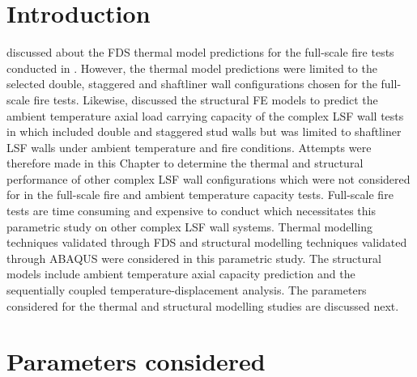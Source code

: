 \section{Introduction}

 discussed about the FDS thermal model predictions for the full-scale fire tests conducted in . However, the thermal model predictions were limited to the selected double, staggered and shaftliner wall configurations chosen for the full-scale fire tests. Likewise,  discussed the structural FE models to predict the ambient temperature axial load carrying capacity of the complex LSF wall tests in  which included double and staggered stud walls but was limited to shaftliner LSF walls under ambient temperature and fire conditions. Attempts were therefore made in this Chapter to determine the thermal and structural performance of other complex LSF wall configurations which were not considered for in the full-scale fire and ambient temperature capacity tests. Full-scale fire tests are time consuming and expensive to conduct which necessitates this parametric study on other complex LSF wall systems. Thermal modelling techniques validated through FDS and structural modelling techniques validated through ABAQUS were considered in this parametric study. The structural models include ambient temperature axial capacity prediction and the sequentially coupled temperature-displacement analysis. The parameters considered for the thermal and structural modelling studies are discussed next. 

\section{Parameters considered}

